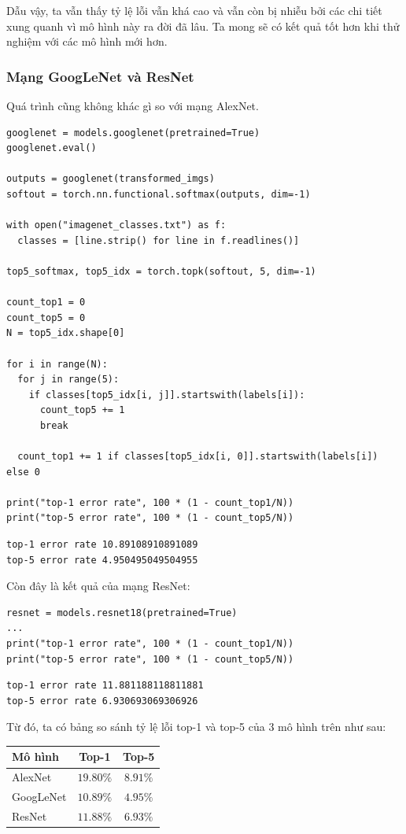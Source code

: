 \documentclass[a4paper]{article}
\begin{document}
\noindent
Dẫu vậy, ta vẫn thấy tỷ lệ lỗi vẫn khá cao và vẫn còn bị nhiễu bởi các chi tiết xung quanh vì mô hình này ra đời đã lâu. Ta mong sẽ có kết quả tốt hơn khi thử nghiệm với các mô hình mới hơn.
\subsubsection{Mạng GoogLeNet và ResNet}
Quá trình cũng không khác gì so với mạng AlexNet.
\begin{lstlisting}
googlenet = models.googlenet(pretrained=True)
googlenet.eval()

outputs = googlenet(transformed_imgs)
softout = torch.nn.functional.softmax(outputs, dim=-1)

with open("imagenet_classes.txt") as f:
  classes = [line.strip() for line in f.readlines()]

top5_softmax, top5_idx = torch.topk(softout, 5, dim=-1)

count_top1 = 0
count_top5 = 0
N = top5_idx.shape[0]

for i in range(N):
  for j in range(5):
    if classes[top5_idx[i, j]].startswith(labels[i]):
      count_top5 += 1
      break

  count_top1 += 1 if classes[top5_idx[i, 0]].startswith(labels[i]) else 0

print("top-1 error rate", 100 * (1 - count_top1/N))
print("top-5 error rate", 100 * (1 - count_top5/N))
\end{lstlisting}
\begin{verbatim}
top-1 error rate 10.89108910891089
top-5 error rate 4.950495049504955
\end{verbatim}
Còn đây là kết quả của mạng ResNet:
\begin{lstlisting}
resnet = models.resnet18(pretrained=True)
...
print("top-1 error rate", 100 * (1 - count_top1/N))
print("top-5 error rate", 100 * (1 - count_top5/N))
\end{lstlisting}
\begin{verbatim}
top-1 error rate 11.881188118811881
top-5 error rate 6.930693069306926
\end{verbatim}
Từ đó, ta có bảng so sánh tỷ lệ lỗi top-1 và top-5 của 3 mô hình trên như sau:
\begin{table}[!h]
\centering
{\renewcommand{\arraystretch}{1}
\begin{tabular}{|l|c|c|}
\hline
\textbf{Mô hình} & \textbf{Top-1} & \textbf{Top-5} \\ \hline
AlexNet          & $19.80\%$              & $8.91\%$              \\ \hline
GoogLeNet        & $\mathbf{10.89\%}$              & $\mathbf{4.95\%}$              \\ \hline
ResNet           & $11.88\%$              & $6.93\%$              \\ \hline
\end{tabular}}
\end{table}
\end{document}
